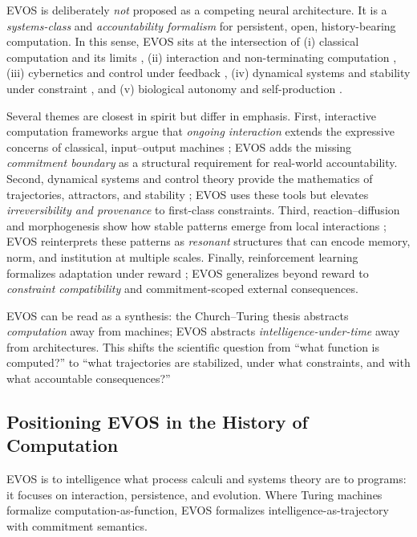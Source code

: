 \documentclass[11pt]{article}
\begin{document}
EVOS is deliberately \emph{not} proposed as a competing neural architecture.
It is a \emph{systems-class} and \emph{accountability formalism} for persistent,
open, history-bearing computation. In this sense, EVOS sits at the intersection
of (i) classical computation and its limits \cite{turing1936,church1936},
(ii) interaction and non-terminating computation \cite{wegner1997},
(iii) cybernetics and control under feedback \cite{wiener1948,kalman1960},
(iv) dynamical systems and stability under constraint \cite{strogatz1994},
and (v) biological autonomy and self-production \cite{maturana1980}.

Several themes are closest in spirit but differ in emphasis. First, interactive
computation frameworks argue that \emph{ongoing interaction} extends the expressive
concerns of classical, input--output machines \cite{wegner1997}; EVOS adds the
missing \emph{commitment boundary} as a structural requirement for real-world
accountability. Second, dynamical systems and control theory provide the mathematics
of trajectories, attractors, and stability \cite{strogatz1994,kalman1960}; EVOS
uses these tools but elevates \emph{irreversibility and provenance} to first-class
constraints. Third, reaction--diffusion and morphogenesis show how stable patterns
emerge from local interactions \cite{turing1952}; EVOS reinterprets these patterns
as \emph{resonant} structures that can encode memory, norm, and institution at
multiple scales. Finally, reinforcement learning formalizes adaptation under reward
\cite{sutton2018}; EVOS generalizes beyond reward to \emph{constraint compatibility}
and commitment-scoped external consequences.

EVOS can be read as a synthesis: the Church--Turing thesis abstracts \emph{computation}
away from machines; EVOS abstracts \emph{intelligence-under-time} away from architectures.
This shifts the scientific question from ``what function is computed?'' to ``what
trajectories are stabilized, under what constraints, and with what accountable
consequences?''

\subsection{Positioning EVOS in the History of Computation}
\label{sec:position-history}

EVOS is to intelligence what process calculi and systems theory are to programs: it focuses on
interaction, persistence, and evolution. Where Turing machines formalize computation-as-function,
EVOS formalizes intelligence-as-trajectory with commitment semantics.
\end{document}
